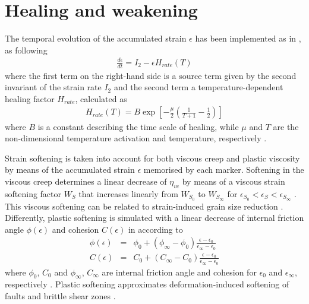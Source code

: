 \section{Healing and weakening}\label{sec:healing}
The temporal evolution of the accumulated strain $\epsilon$ has been implemented as in \citet{Fuchs2019,Fuchs2021}, as following
\begin{eqnarray}\label{eq:healing}
  \frac{d\epsilon}{dt}=I_2 - \epsilon H_{rate}(T)
\end{eqnarray}
where the first term on the right-hand side is a source term given by the second invariant of the strain rate $I_2$ and the second term a
temperature-dependent healing factor $H_{rate}$, calculated as
\begin{eqnarray}\label{eq:healing_rate}
  H_{rate}(T)=B \exp \left[-\frac{\mu}{2}\left(\frac{1}{T+1}-\frac{1}{2}\right)\right]
\end{eqnarray}
where $B$ is a constant describing the time scale of healing, while $\mu$ and $T$ are the non-dimensional temperature activation and temperature,
respectively \citep{Fuchs2019,Fuchs2021}.

Strain softening is taken into account for both viscous creep and plastic viscosity \citep{Huismans2003,Babeyko2005,Huismans2005,Sobolev2005,Warren2008a} by
means of the accumulated strain $\epsilon$ memorised by each marker. Softening in the viscous creep determines a linear decrease of $\eta_{vc}$ by means of a
viscous strain softening factor $W_S$ that increases linearly from $W_{S_0}$ to $W_{S_{\infty}}$ for $\epsilon_{S_0}<\epsilon_S<\epsilon_{S_{\infty}}$ 
\citep{Warren2008a}. This viscous softening can be related to strain-induced grain size reduction \citep{Warren2008a}. Differently, plastic softening is 
simulated with a linear decrease of internal friction angle $\phi(\epsilon)$ and cohesion $C(\epsilon)$ in according to
\begin{eqnarray}
\label{eq:friction1}\phi(\epsilon)&=&\phi_0+(\phi_{\infty}-\phi_0)\frac{\epsilon-\epsilon_0}{\epsilon_{\infty}-\epsilon_0}\\
\label{eq:friction2}C(\epsilon)&=&C_0+(C_{\infty}-C_0)\frac{\epsilon-\epsilon_0}{\epsilon_{\infty}-\epsilon_0}
\end{eqnarray}
where $\phi_0$, $C_0$ and $\phi_{\infty}$, $C_{\infty}$ are internal friction angle and cohesion for $\epsilon_0$ and $\epsilon_{\infty}$, respectively
\citep{Huismans2003,Huismans2005,Warren2008a,Thieulot2014}. Plastic softening approximates deformation-induced softening of faults and brittle shear zones
\citep{Warren2008a}.